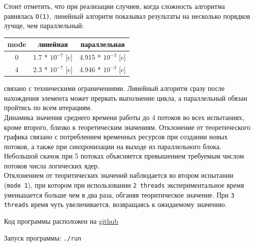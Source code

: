 Стоит отметить, что при реализации случиев, когда сложность алгоритма равнялась \verb|O(1)|, линейный алгоритм показывал результаты на несколько порядков лучще, чем параллельный:

\begin{center}
\renewcommand{\arraystretch}{1.4}
\begin{tabular}{|c|c|c|} 
    \hline
    mode & линейная & параллельная \\
    \hline
    0 & 1.7 * $10^{-7}$ [c] & 4.915 * $10^{-3}$ [c]\\
    \hline
    4 & 2.3 * $10^{-7}$ [c] & 4.946 * $10^{-3}$ [c]\\
    \hline
\end{tabular}
\end{center}

\newpage

 связано с техническими ограничениями. Линейный алгоритм сразу после нахождения элемента может прервать выполнение цикла, а параллельный обязан пройтись по всем итерациям.\\

Динамика значения среднего времени работы до 4 потоков во всех испытаниях, кроме второго, близко к теоретическим значениям. Отклонение от теоретического графика связано с потреблением временных ресурсов при создании новых потоков, а также при синхронизации на выходе из параллельного блока. Небольшой скачок при 5 потоках объясняется превышением требуемым числом потоков числа логических ядер.\\

Отклонением от теоритических значений наблюдается во втором испытании (\verb|mode 1|), при котором при использовании \verb|2 threads| экспериментальное время уменьшается больше чем в два раза, обганяя теоритическое значение. При \verb|3 threads| время чуть увеличивается, возвращаясь к ожидаемому значению. 


\noindent Код программы расположен на \href{https://github.com/GektorPestarzt/MEPHI_parallel/tree/main/lab2}{github}

\noindent Запуск программы: \verb|./run|